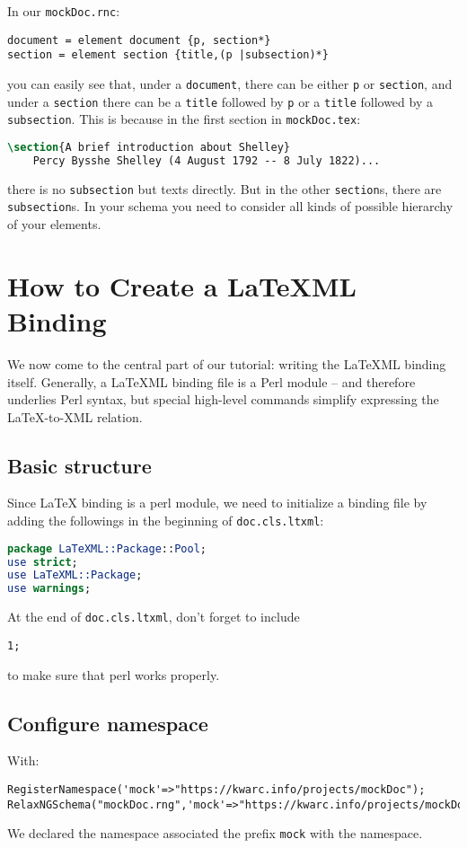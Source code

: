 \documentclass[a4paper]{article}
\def\latexml{{\LaTeX}ML\xspace}
\begin{document}
 In our \lstinline|mockDoc.rnc|:
\begin{lstlisting}
document = element document {p, section*}
section = element section {title,(p |subsection)*}
\end{lstlisting}
you can easily see that, under a \lstinline|document|, there can be either \lstinline|p| or \lstinline|section|, and under a \lstinline|section| there can be a \lstinline|title| followed by \lstinline|p| or a \lstinline|title| followed by a \lstinline|subsection|. This is because in the first section in \lstinline|mockDoc.tex|:
\begin{lstlisting}[language=TeX]
\section{A brief introduction about Shelley}
    Percy Bysshe Shelley (4 August 1792 -- 8 July 1822)...
\end{lstlisting}
there is no \lstinline|subsection| but texts directly. But in the other \lstinline|section|s, there are \lstinline|subsection|s. In your schema you need to consider all kinds of possible hierarchy of your elements.



\section{How to Create a \latexml Binding}
We now come to the central part of our tutorial: writing the \latexml binding
itself. Generally, a \latexml binding file is a Perl module -- and therefore underlies
Perl syntax, but special high-level commands simplify expressing the {\LaTeX}-to-XML
relation.

\subsection{Basic structure}
Since {\LaTeX} binding is a perl module, we need to initialize a binding file by adding
the followings in the beginning of \lstinline|doc.cls.ltxml|:
\begin{lstlisting}[language=Perl]
package LaTeXML::Package::Pool;
use strict;
use LaTeXML::Package;
use warnings;
\end{lstlisting}
At the end of \lstinline|doc.cls.ltxml|, don't forget to include
\begin{lstlisting}
1;
\end{lstlisting}
to make sure that perl works properly.

\subsection{Configure namespace}
 With:
\begin{lstlisting}
RegisterNamespace('mock'=>"https://kwarc.info/projects/mockDoc");
RelaxNGSchema("mockDoc.rng",'mock'=>"https://kwarc.info/projects/mockDoc");
\end{lstlisting}
 We declared the namespace associated the prefix \lstinline|mock| with the
 namespace.
\end{document}
